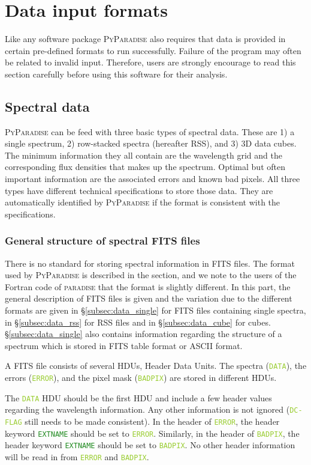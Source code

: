 \documentclass[usenatbib,usegraphicx,useAMS,onecolumn]{mn2e}
\newcommand{\codeline}[1]{\lstinline|#1|}
\newcommand{\headerkw}[1]{\textcolor{ForestGreen}{\codeline{#1}}}
\newcommand{\headerval}[1]{\textcolor{YellowGreen}{\codeline{#1}}}
\begin{document}
\section{Data input formats}
\label{sec:data}
Like any software package \textsc{PyParadise} also requires that data is provided in certain pre-defined formats to run successfully.
Failure of the program may often be related to invalid input. 
Therefore, users are strongly encourage to read this section carefully before using this software for their analysis. 
\subsection{Spectral data}
\label{subsec:data_multidim}
\textsc{PyParadise} can be feed with three basic types of spectral data.
These are 1) a single spectrum, 2) row-stacked spectra (hereafter RSS), and 3) 3D data cubes.
The minimum information they all contain are the wavelength grid and the corresponding flux densities that makes up the spectrum.
Optimal but often important information are the associated errors and known bad pixels.
All three types have different technical specifications to store those data.
They are automatically identified by \textsc{PyParadise} if the format is consistent with the specifications.

\subsubsection{General structure of spectral FITS files}
There is no standard for storing spectral information in FITS files.
The format used by \textsc{PyParadise} is described in the section, and we note to the users of the Fortran code of \textsc{paradise} that the format is slightly different.
In this part, the general description of FITS files is given and the variation due to the different formats are given in \S\ref{subsec:data_single} for FITS files containing single spectra, in \S\ref{subsec:data_rss} for RSS files and in \S\ref{subsec:data_cube} for cubes.
\S\ref{subsec:data_single} also contains information regarding the structure of a spectrum which is stored in FITS table format or ASCII format.

A FITS file consists of several HDUs, Header Data Units.
The spectra (\headerval{DATA}), the errors (\headerval{ERROR}), and the pixel mask (\headerval{BADPIX}) are stored in different HDUs.

The \headerval{DATA} HDU should be the first HDU and include a few header values regarding the wavelength information.
Any other information is not ignored (\headerval{DC-FLAG} still needs to be made consistent).
In the header of \headerval{ERROR}, the header keyword \headerkw{EXTNAME} should be set to \headerval{ERROR}.
Similarly, in the header of \headerval{BADPIX}, the header keyword \headerkw{EXTNAME} should be set to \headerval{BADPIX}.
No other header information will be read in from \headerval{ERROR} and \headerval{BADPIX}.
\end{document}
